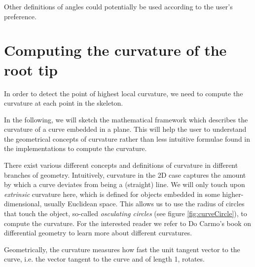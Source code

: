 Other definitions of angles \cite{french2009high,de2012validity} could potentially be used according to the user's preference. 


\section{Computing the curvature of the root tip}


In order to detect the point of highest local curvature, we need to compute the curvature at each point in the skeleton. 


In the following, we will sketch the mathematical framework which describes the curvature of a curve embedded in a plane.
This will help the user to understand the geometrical concepts of curvature rather than less intuitive formulae found in the implementations to compute the curvature. %

There exist various different concepts and definitions of curvature in different branches of geometry.
Intuitively, curvature in the 2D case captures the amount by which a curve deviates from being a (straight) line.
We will only touch upon \textit{extrinsic} curvature here, which is defined for objects embedded in some higher-dimensional, usually Euclidean space. This allows us to use the radius of circles that touch the object, so-called \textit{osculating circles} (see figure \ref{fig:curveCircle}), to compute the curvature. 
For the interested reader we refer to Do Carmo's book on differential geometry \cite{do2016differential} to learn more about different curvatures.


Geometrically, the curvature measures how fast the unit tangent vector to the curve, i.e. the vector tangent to the curve and of length 1, rotates. 

